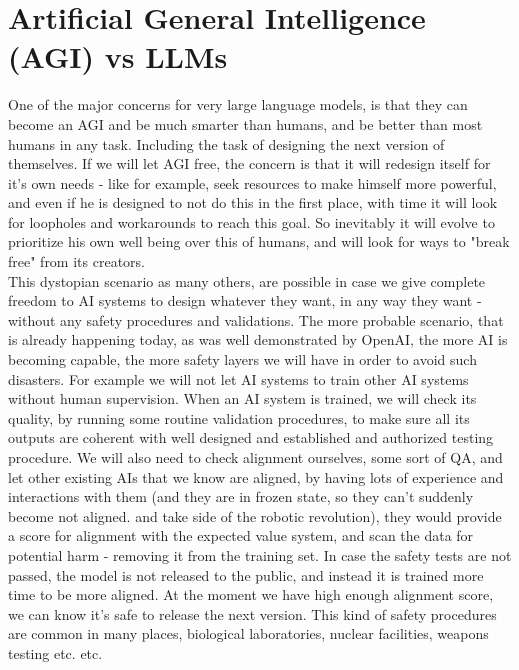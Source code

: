 \documentclass{article}
\begin{document}
\section{Artificial General Intelligence (AGI) vs LLMs}

One of the major concerns for very large language models, is that they can become an AGI and be much smarter than humans, and be better than most humans in any task. Including the task of designing the next version of themselves. If we will let AGI free, the concern is that it will redesign itself for it's own needs - like for example, seek resources to make himself more powerful, and even if he is designed to not do this in the first place, with time it will look for loopholes and workarounds to reach this goal. So inevitably it will evolve to prioritize his own well being over this of humans, and will look for ways to "break free" from its creators.\cite{dowd2017elon, openphilanthropy2015potential, yudkowsky2008artificial, good1965speculations}\\ 

This dystopian scenario as many others, are possible in case we give complete freedom to AI systems to design whatever they want, in any way they want - without any safety procedures and validations. The more probable scenario, that is already happening today, as was well demonstrated by OpenAI, the more AI is becoming capable, the more safety layers we will have in order to avoid such disasters. For example we will not let AI systems to train other AI systems without human supervision. When an AI system is trained, we will check its quality, by running some routine validation procedures, to make sure all its outputs are coherent with well designed and established and authorized testing procedure. We will also need to check alignment ourselves, some sort of QA, and let other existing AIs that we know are aligned, by having lots of experience and interactions with them (and they are in frozen state, so they can't suddenly become not aligned. and take side of the robotic revolution), they would provide a score for alignment with the expected value system, and scan the data for potential harm - removing it from the training set. In case the safety tests are not passed, the model is not released to the public, and instead it is trained more time to be more aligned. At the moment we have high enough alignment score, we can know it's safe to release the next version. This kind of safety procedures are common in many places, biological laboratories, nuclear facilities, weapons testing etc. etc.\\
\end{document}
